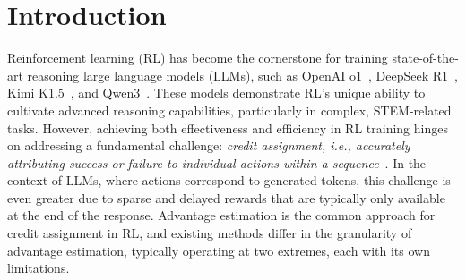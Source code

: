 \vspace{-0.4cm}
\section{Introduction}
\label{sec:introduction}
\vspace{-0.2cm}

Reinforcement learning (RL) has become the cornerstone for training state-of-the-art reasoning large language models (LLMs), such as OpenAI o1~\cite{openai2024openaio1card}, DeepSeek R1~\cite{deepseekai2025deepseekr1incentivizingreasoningcapability}, Kimi K1.5~\cite{kimiteam2025kimik15scalingreinforcement}, and Qwen3~\cite{qwen3technicalreport}. These models demonstrate RL's unique ability to cultivate advanced reasoning capabilities, particularly in complex, STEM-related tasks. However, achieving both effectiveness and efficiency in RL training hinges on addressing a fundamental challenge: \emph{credit assignment, i.e., accurately attributing success or failure to individual actions within a sequence}~\cite{credit-assignment-def}. 
In the context of LLMs, where actions correspond to generated tokens, this challenge is even greater due to sparse and delayed rewards that are typically only available at the end of the response. Advantage estimation is the common approach for credit assignment in RL, and existing methods differ in the granularity of advantage estimation, typically operating at two extremes, each with its own limitations.

